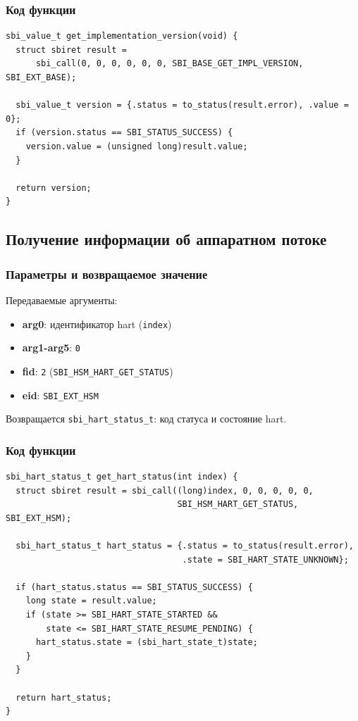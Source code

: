 \documentclass[12pt,a4paper]{report}
\begin{document}
\subsubsection*{Код функции}
\begin{verbatim}
sbi_value_t get_implementation_version(void) {
  struct sbiret result =
      sbi_call(0, 0, 0, 0, 0, 0, SBI_BASE_GET_IMPL_VERSION, SBI_EXT_BASE);

  sbi_value_t version = {.status = to_status(result.error), .value = 0};
  if (version.status == SBI_STATUS_SUCCESS) {
    version.value = (unsigned long)result.value;
  }

  return version;
}
\end{verbatim}

\subsection*{Получение информации об аппаратном потоке}
\subsubsection*{Параметры и возвращаемое значение}
Передаваемые аргументы:
\begin{itemize}
    \item \textbf{arg0}: идентификатор hart (\texttt{index})
    \item \textbf{arg1-arg5}: \texttt{0}
    \item \textbf{fid}: \texttt{2} (\texttt{SBI\_HSM\_HART\_GET\_STATUS})
    \item \textbf{eid}: \texttt{SBI\_EXT\_HSM}
\end{itemize}
Возвращается \texttt{sbi\_hart\_status\_t}: код статуса и состояние hart.
\subsubsection*{Код функции}
\begin{verbatim}
sbi_hart_status_t get_hart_status(int index) {
  struct sbiret result = sbi_call((long)index, 0, 0, 0, 0, 0,
                                  SBI_HSM_HART_GET_STATUS, SBI_EXT_HSM);

  sbi_hart_status_t hart_status = {.status = to_status(result.error),
                                   .state = SBI_HART_STATE_UNKNOWN};

  if (hart_status.status == SBI_STATUS_SUCCESS) {
    long state = result.value;
    if (state >= SBI_HART_STATE_STARTED &&
        state <= SBI_HART_STATE_RESUME_PENDING) {
      hart_status.state = (sbi_hart_state_t)state;
    }
  }

  return hart_status;
}
\end{verbatim}
\end{document}

